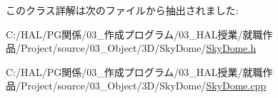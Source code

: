 このクラス詳解は次のファイルから抽出されました\+:\begin{DoxyCompactItemize}
\item 
C\+:/\+H\+A\+L/\+P\+G関係/03\+\_\+作成プログラム/03\+\_\+\+H\+A\+L授業/就職作品/\+Project/source/03\+\_\+\+Object/3\+D/\+Sky\+Dome/\mbox{\hyperlink{_sky_dome_8h}{Sky\+Dome.\+h}}\item 
C\+:/\+H\+A\+L/\+P\+G関係/03\+\_\+作成プログラム/03\+\_\+\+H\+A\+L授業/就職作品/\+Project/source/03\+\_\+\+Object/3\+D/\+Sky\+Dome/\mbox{\hyperlink{_sky_dome_8cpp}{Sky\+Dome.\+cpp}}\end{DoxyCompactItemize}
